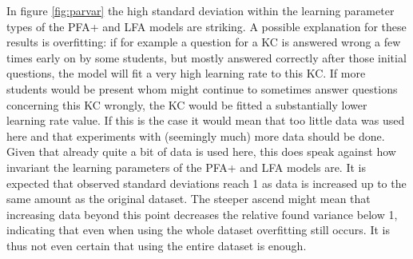 \documentclass{scrartcl}
\begin{document}
In figure \ref{fig:parvar} the high standard deviation within the learning parameter types of the PFA+ and LFA models are striking. A possible explanation for these results is overfitting: if for example a question for a KC is answered wrong a few times early on by some students, but mostly answered correctly after those initial questions, the model will fit a very high learning rate to this KC. If more students would be present whom might continue to sometimes answer questions concerning this KC wrongly, the KC would be fitted a substantially lower learning rate value. If this is the case it would mean that too little data was used here and that experiments with (seemingly much) more data should be done. Given that already quite a bit of data is used here, this does speak against how invariant the learning parameters of the PFA+ and LFA models are. It is expected that observed standard deviations reach 1 as data is increased up to the same amount as the original dataset. The steeper ascend might mean that increasing data beyond this point decreases the relative found variance below 1, indicating that even when using the whole dataset overfitting still occurs. It is thus not even certain that using the entire dataset is enough.
\end{document}
